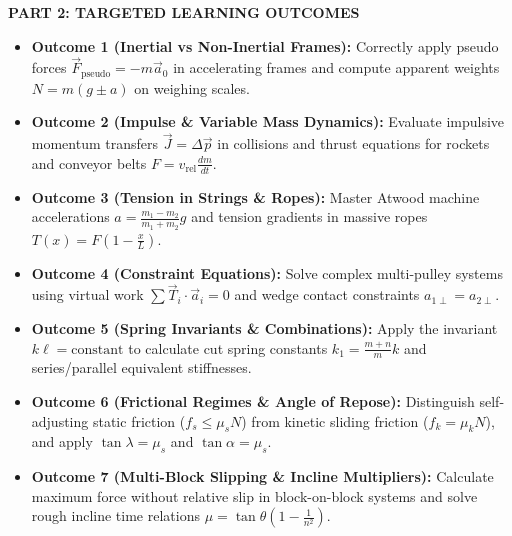 \documentclass[11pt,a4paper]{article}
\begin{document}
\vspace{5pt}

\begin{tcolorbox}[sectionbanner]
  {\large \textbf{\textsf{PART 2: TARGETED LEARNING OUTCOMES}}}
\end{tcolorbox}
\vspace{3pt}

\begin{itemize}[leftmargin=18pt,itemsep=2.5pt,topsep=1pt]
  \item[$\square$] \textbf{\textcolor{primaryDark}{Outcome 1 (Inertial vs Non-Inertial Frames):}} Correctly apply pseudo forces $\vec{F}_{\text{pseudo}} = -m\vec{a}_0$ in accelerating frames and compute apparent weights $N = m(g \pm a)$ on weighing scales.
  \item[$\square$] \textbf{\textcolor{primaryDark}{Outcome 2 (Impulse \& Variable Mass Dynamics):}} Evaluate impulsive momentum transfers $\vec{J} = \Delta\vec{p}$ in collisions and thrust equations for rockets and conveyor belts $F = v_{\text{rel}}\frac{dm}{dt}$.
  \item[$\square$] \textbf{\textcolor{primaryDark}{Outcome 3 (Tension in Strings \& Ropes):}} Master Atwood machine accelerations $a = \frac{m_1 - m_2}{m_1 + m_2}g$ and tension gradients in massive ropes $T(x) = F\left(1 - \frac{x}{L}\right)$.
  \item[$\square$] \textbf{\textcolor{primaryDark}{Outcome 4 (Constraint Equations):}} Solve complex multi-pulley systems using virtual work $\sum \vec{T}_i \cdot \vec{a}_i = 0$ and wedge contact constraints $a_{1\perp} = a_{2\perp}$.
  \item[$\square$] \textbf{\textcolor{primaryDark}{Outcome 5 (Spring Invariants \& Combinations):}} Apply the invariant $k\ell = \text{constant}$ to calculate cut spring constants $k_1 = \frac{m+n}{m}k$ and series/parallel equivalent stiffnesses.
  \item[$\square$] \textbf{\textcolor{primaryDark}{Outcome 6 (Frictional Regimes \& Angle of Repose):}} Distinguish self-adjusting static friction ($f_s \le \mu_s N$) from kinetic sliding friction ($f_k = \mu_k N$), and apply $\tan\lambda = \mu_s$ and $\tan\alpha = \mu_s$.
  \item[$\square$] \textbf{\textcolor{primaryDark}{Outcome 7 (Multi-Block Slipping \& Incline Multipliers):}} Calculate maximum force without relative slip in block-on-block systems and solve rough incline time relations $\mu = \tan\theta\left(1 - \frac{1}{n^2}\right)$.
\end{itemize}
\end{document}
